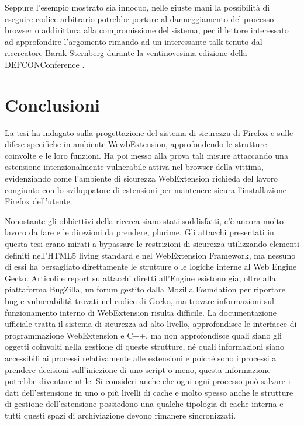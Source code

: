 \documentclass{sapthesis}
\begin{document}
                Seppure l'esempio mostrato sia innocuo, nelle giuste mani la possibilità di
                eseguire codice arbitrario potrebbe portare al danneggiamento del processo
                browser o addirittura alla compromissione del sistema, per il lettore interessato
                ad approfondire l'argomento rimando ad un interessante talk tenuto dal ricercatore
                Barak Sternberg durante la ventinovesima edizione della DEFCONConference \cite{barak-sternberg-browser-extensions}.






\chapter{Conclusioni}
\label{cap:conclusioni}
    La tesi ha indagato sulla progettazione del sistema di sicurezza di Firefox e sulle difese
    specifiche in ambiente WewbExtension, approfondendo le strutture coinvolte e le loro funzioni.
    Ha poi messo alla prova tali misure attaccando una estensione intenzionalmente vulnerabile
    attiva nel browser della vittima, evidenziando come l'ambiente di sicurezza WebExtension richieda
    del lavoro congiunto con lo sviluppatore di estensioni per mantenere sicura l'installazione
    Firefox dell'utente.

    Nonostante gli obbiettivi della ricerca siano stati soddisfatti, c'è ancora molto lavoro da fare
    e le direzioni da prendere, plurime.
    Gli attacchi presentati in questa tesi erano mirati a bypassare le restrizioni di sicurezza
    utilizzando elementi definiti nell'HTML5 living standard e nel WebExtension Framework, ma 
    nessuno di essi ha bersagliato direttamente le strutture o le logiche interne al Web Engine Gecko.
    Articoli e report su attacchi diretti all'Engine esistono gia, oltre alla piattaforma BugZilla, un forum 
    gestito dalla Mozilla Foundation per riportare bug e vulnerabilità trovati nel codice di Gecko,
    ma trovare informazioni sul funzionamento interno di WebExtension risulta difficile.
    La documentazione ufficiale tratta il sistema di sicurezza ad alto livello, approfondisce le
    interfacce di programmazione WebExtension e C++, ma non approfondisce quali siano gli oggetti
    coinvolti nella gestione di queste strutture, né quali informazioni siano accessibili
    ai processi relativamente alle estensioni e poiché sono i processi a prendere decisioni
    sull'iniezione di uno script o meno, questa informazione potrebbe diventare utile. Si consideri
    anche che ogni ogni processo può salvare i dati dell'estensione in uno o più livelli di cache
    e molto spesso anche le strutture di gestione dell'estensione possiedono una qualche tipologia
    di cache interna e tutti questi spazi di archiviazione devono rimanere sincronizzati.
    
\end{document}
